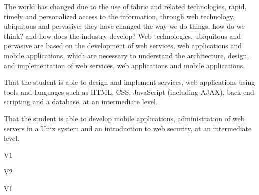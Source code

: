 \begin{syllabus}


\begin{justification}
The world has changed due to the use of fabric and related technologies, rapid, timely and personalized access to the
information, through web technology, ubiquitous and pervasive; they have changed the way we do things, how do we think? and how does the industry develop?
Web technologies, ubiquitous and pervasive are based on the development of web services, web applications and mobile applications,
which are necessary to understand the architecture, design, and implementation of web services, web applications and mobile applications.
\end{justification}

\begin{goals}
    \item That the student is able to design and implement services, web applications using tools and languages such as HTML, CSS, JavaScript (including AJAX), back-end scripting and a database, at an intermediate level.
    \item That the student is able to develop mobile applications, administration of web servers in a Unix system and an introduction to web security, at an intermediate level.
\end{goals}

\begin{outcomes}{V1}
    \item {}
    \item {}
    \item {}
    \item {}
\end{outcomes}

\begin{outcomes}{V2}
    \item {}
    \item {}
    \item {}
    \item {}
\end{outcomes}

\begin{competences}{V1}
    \item {}
    \item {}
    \item {}
\end{competences}


\end{syllabus}
